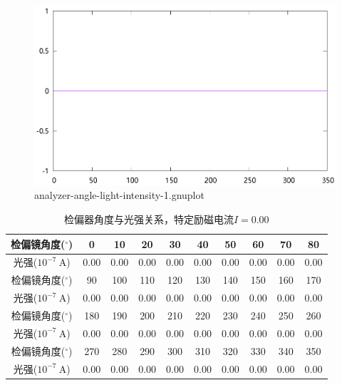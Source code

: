 \documentclass{ctexart}
\newcommand{\si}[1]{\  \mathrm{#1}}
\begin{document}
    \begin{figure}[H]
      \centering
      \includegraphics[width=\linewidth]{../output/analyzer-angle-light-intensity-1.gnuplot}
      \caption{analyzer-angle-light-intensity-1.gnuplot}
      \label{fig:analyzer-angle-light-intensity-1.gnuplot}
    \end{figure}
    \begin{table}[H]
      \centering
      \begin{tabular}{|c|c|c|c|c|c|c|c|c|c|}
        \hline
        检偏镜角度(${}^{\circ}$) & 0 & 10 & 20 & 30 & 40 & 50 & 60 & 70 & 80 \\\hline
        光强($10^{-7} \si{A}$)  & 0.00 & 0.00 & 0.00 & 0.00 & 0.00 & 0.00 & 0.00 & 0.00 & 0.00 \\\hline
        检偏镜角度(${}^{\circ}$) & 90 & 100 & 110 & 120 & 130 & 140 & 150 & 160 & 170 \\\hline
        光强($10^{-7} \si{A}$)  & 0.00 & 0.00 & 0.00 & 0.00 & 0.00 & 0.00 & 0.00 & 0.00 & 0.00  \\\hline
        检偏镜角度(${}^{\circ}$) & 180 & 190 & 200 & 210 & 220 & 230 & 240 & 250 & 260  \\\hline
        光强($10^{-7} \si{A}$)  & 0.00 & 0.00 & 0.00 & 0.00 & 0.00 & 0.00 & 0.00 & 0.00 & 0.00 \\\hline
        检偏镜角度(${}^{\circ}$) & 270 & 280 & 290 & 300 & 310 & 320 & 330 & 340 & 350 \\\hline
        光强($10^{-7} \si{A}$)  & 0.00 & 0.00 & 0.00 & 0.00 & 0.00 & 0.00 & 0.00 & 0.00 & 0.00 \\\hline
      \end{tabular}
      \caption{检偏器角度与光强关系，特定励磁电流$I=0.00$}
    \end{table}
\end{document}
